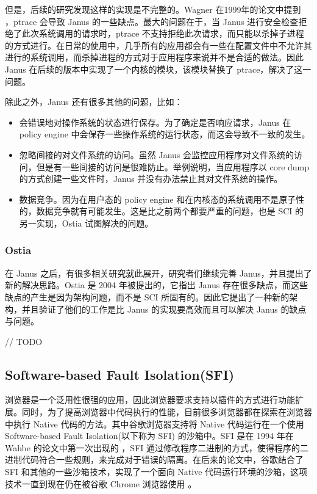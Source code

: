 \documentclass[final,12pt]{elsarticle}
\begin{document}
但是，后续的研究发现这样的实现是不完整的。Wagner 在1999年的论文中提到 \cite{wagner1999janus}，ptrace 会导致 Janus 的一些缺点。最大的问题在于，当 Janus 进行安全检查拒绝了此次系统调用的请求时，ptrace 不支持拒绝此次请求，而只能以杀掉子进程的方式进行。在日常的使用中，几乎所有的应用都会有一些在配置文件中不允许其进行的系统调用，而杀掉进程的方式对于应用程序来说并不是合适的做法。因此 Janus 在后续的版本中实现了一个内核的模块，该模块替换了 ptrace，解决了这一问题。

除此之外，Janus 还有很多其他的问题，比如：

\begin{itemize}
\item
会错误地对操作系统的状态进行保存。为了确定是否响应请求，Janus 在 policy engine 中会保存一些操作系统的运行状态，而这会导致不一致的发生。
\item
忽略间接的对文件系统的访问。虽然 Janus 会监控应用程序对文件系统的访问，但是有一些间接的访问是很难防止。举例说明，当应用程序以 core dump 的方式创建一些文件时，Janus 并没有办法禁止其对文件系统的操作。
\item
数据竞争。因为在用户态的 policy engine 和在内核态的系统调用不是原子性的，数据竞争就有可能发生。这是比之前两个都要严重的问题，也是 SCI 的另一实现，Ostia 试图解决的问题\cite{garfinkel2003traps}。
\end{itemize}

\subsubsection{Ostia}
\label{sss:ostia}

在 Janus 之后，有很多相关研究就此展开，研究者们继续完善 Janus，并且提出了新的解决思路。Ostia \cite{garfinkel} 是 2004 年被提出的，它指出 Janus 存在很多缺点，而这些缺点的产生是因为架构问题，而不是 SCI 所固有的。因此它提出了一种新的架构，并且验证了他们的工作是比 Janus 的实现要高效而且可以解决 Janus 的缺点与问题。

// TODO

\subsection{Software-based Fault Isolation(SFI)}
\label{ss:sfi}

浏览器是一个泛用性很强的应用，因此浏览器要求支持以插件的方式进行功能扩展。同时，为了提高浏览器中代码执行的性能，目前很多浏览器都在探索在浏览器中执行 Native 代码的方法。其中谷歌浏览器支持将 Native 代码运行在一个使用 Software-based Fault Isolation(以下称为 SFI) 的沙箱中。SFI 是在 1994 年在 Wahbe 的论文中第一次出现的 \cite{wahbe1994efficient}，SFI 通过修改程序二进制的方式，使得程序的二进制代码符合一些规则，来完成对于错误的隔离。在后来的论文中，谷歌结合了 SFI 和其他的一些沙箱技术，实现了一个面向 Native 代码运行环境的沙箱，这项技术一直到现在仍在被谷歌 Chrome 浏览器使用 \cite{nacl}。
\end{document}
